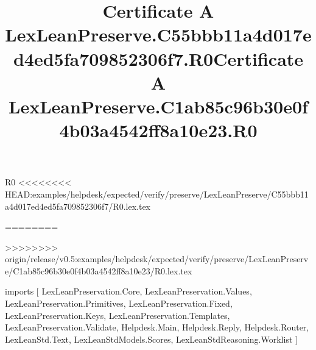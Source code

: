 \begin{lexlean}{R0}
<<<<<<<< HEAD:examples/helpdesk/expected/verify/preserve/LexLeanPreserve/C55bbb11a4d017ed4ed5fa709852306f7/R0.lex.tex
\title{Certificate A LexLeanPreserve.C55bbb11a4d017ed4ed5fa709852306f7.R0}
========
\title{Certificate A LexLeanPreserve.C1ab85c96b30e0f4b03a4542ff8a10e23.R0}
>>>>>>>> origin/release/v0.5:examples/helpdesk/expected/verify/preserve/LexLeanPreserve/C1ab85c96b30e0f4b03a4542ff8a10e23/R0.lex.tex
\begin{coremodule}
imports [
  LexLeanPreservation.Core,
  LexLeanPreservation.Values,
  LexLeanPreservation.Primitives,
  LexLeanPreservation.Fixed,
  LexLeanPreservation.Keys,
  LexLeanPreservation.Templates,
  LexLeanPreservation.Validate,
  Helpdesk.Main,
  Helpdesk.Reply,
  Helpdesk.Router,
  LexLeanStd.Text,
  LexLeanStdModels.Scores,
  LexLeanStdReasoning.Worklist
]


\end{coremodule}
\end{lexlean}
